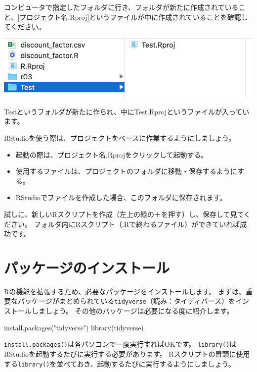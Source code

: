 \documentclass[
]{book}
\newenvironment{Shaded}{\begin{snugshade}}{\end{snugshade}}
\newcommand{\FunctionTok}[1]{\textcolor[rgb]{0.00,0.00,0.00}{#1}}
\newcommand{\NormalTok}[1]{#1}
\newcommand{\StringTok}[1]{\textcolor[rgb]{0.31,0.60,0.02}{#1}}
\providecommand{\tightlist}{%
  \setlength{\itemsep}{0pt}\setlength{\parskip}{0pt}}
\begin{document}
コンピュータで指定したフォルダに行き、フォルダが新たに作成されていること、{[}プロジェクト名.Rproj{]}というファイルが中に作成されていることを確認してください。

\begin{center}\includegraphics[width=0.5\linewidth]{image/project5} \end{center}

Testというフォルダが新たに作られ、中にTest.Rprojというファイルが入っています。

RStudioを使う際は、プロジェクトをベースに作業するようにしましょう。

\begin{itemize}
\tightlist
\item
  起動の際は、プロジェクト名.Rprojをクリックして起動する。
\item
  使用するファイルは、プロジェクトのフォルダに移動・保存するようにする。
\item
  RStudioでファイルを作成した場合、このフォルダに保存されます。
\end{itemize}

試しに、新しいRスクリプトを作成（左上の緑の＋を押す）し、保存して見てください。
フォルダ内にRスクリプト（.Rで終わるファイル）ができていれば成功です。

\hypertarget{Packages}{%
\chapter{パッケージのインストール}\label{Packages}}

Rの機能を拡張するため、必要なパッケージをインストールします。
まずは、重要なパッケージがまとめられている\texttt{tidyverse}（読み：タイディバース）をインストールしましょう。
その他のパッケージは必要になる度に紹介します。

\begin{Shaded}
\begin{Highlighting}[]
\FunctionTok{install.packages}\NormalTok{(}\StringTok{"tidyverse"}\NormalTok{)}
\FunctionTok{library}\NormalTok{(tidyverse)}
\end{Highlighting}
\end{Shaded}

\texttt{install.packages()}は各パソコンで一度実行すればOKです。
\texttt{library()}はRStudioを起動するたびに実行する必要があります。
Rスクリプトの冒頭に使用する\texttt{library()}を並べておき、起動するたびに実行するようにしましょう。
\end{document}
